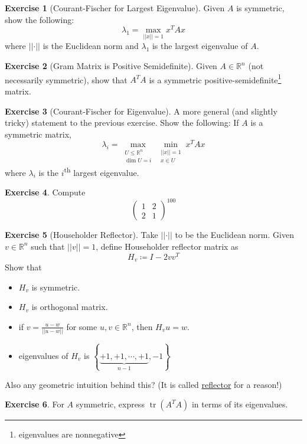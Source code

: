 \documentclass[12pt, a4paper]{article}
\newcommand{\R}{\mathbb{R}}
\newcommand{\norm}[1]{\lvert \lvert #1 \rvert \rvert}
\DeclareMathOperator{\tr}{tr}
\theoremstyle{remark}
\theoremstyle{definition}
\newtheorem{exercise}{Exercise}
\numberwithin{equation}{section}
\numberwithin{definition}{section}
\numberwithin{example}{section}
\numberwithin{exercise}{section}
\numberwithin{remark}{section}
\numberwithin{figure}{section}
\begin{document}
\begin{exercise}[Courant-Fischer for Largest Eigenvalue]
    Given $A$ is symmetric,
    show the following:
    \begin{equation*}
        \lambda_{1} = \max_{\norm{x} = 1} x^T A x
    \end{equation*}
    where $\norm{\cdot}$ is the Euclidean norm and $\lambda_{1}$ is the largest eigenvalue of $A$.
\end{exercise}
\begin{exercise}[Gram Matrix is Positive Semidefinite]
    Given $A \in \R^n$ (not necessarily symmetric),
    show that $A^T A$ is a symmetric positive-semidefinite\footnote{eigenvalues are nonnegative} matrix.
\end{exercise}
\begin{exercise}[Courant-Fischer for Eigenvalue]
    A more general (and slightly tricky) statement to the previous exercise.
    Show the following:
    If $A$ is a symmetric matrix,
    \begin{equation*}
        \lambda_i = \max_{\substack{U \leq \R^n \\ \dim U = i}} \min_{\substack{\norm{x} = 1 \\ x \in U}} x^T A x
    \end{equation*}
    where $\lambda_i$ is the $i$\textsuperscript{th} largest eigenvalue.
\end{exercise}
\begin{exercise}
    Compute
    \begin{equation*}
        \begin{pmatrix}
            1 & 2 \\ 2 & 1
        \end{pmatrix}
        ^{100}
    \end{equation*}
\end{exercise}
\begin{exercise}[Householder Reflector]
    Take $\norm{\cdot}$ to be the Euclidean norm.
    Given $v \in \R^n$ such that $\norm{v} = 1$,
    define Householder reflector matrix as
    \begin{equation*}
        H_v \coloneqq I - 2vv^T
    \end{equation*}
    Show that
    \begin{itemize}
        \item $H_v$ is symmetric.
        \item $H_v$ is orthogonal matrix.
        \item if $v = \frac{u - w}{\norm{u - w}}$ for some $u, v \in \R^n$, then $H_{v} u = w$.
        \item eigenvalues of $H_v$ is $\left\{ \underbrace{+1, +1, \cdots, +1}_{n-1}, -1 \right\}$
    \end{itemize}
    Also any geometric intuition behind this? (It is called \underline{reflector} for a reason!)
\end{exercise}
\begin{exercise}
    For $A$ symmetric,
    express $\tr{(A^T A)}$ in terms of its eigenvalues.
\end{exercise}
\end{document}

